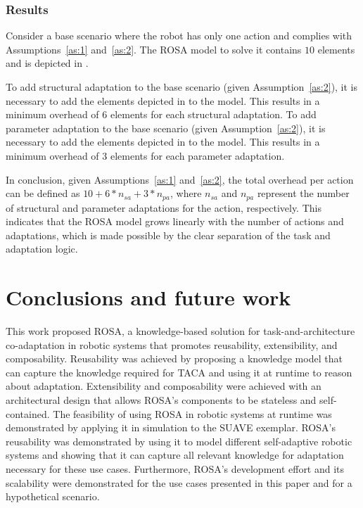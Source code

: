 \subsubsection{Results}
Consider a base scenario where the robot has only one action and complies with Assumptions~\ref{as:1} and~\ref{as:2}. The ROSA model to solve it contains $10$ elements and is depicted in .

To add structural adaptation to the base scenario (given Assumption~\mbox{\ref{as:2}}), it is necessary to add the elements depicted in  to the model.
This results in a minimum overhead of $6$ elements for each structural adaptation. To add parameter adaptation to the base scenario (given Assumption~\mbox{\ref{as:2}}), it is necessary to add the elements depicted in  to the model.
This results in a minimum overhead of $3$ elements for each parameter adaptation.

In conclusion, given Assumptions~\ref{as:1} and~\ref{as:2}, the total overhead per action can be defined as $10 + 6*n_{sa} + 3*n_{pa}$, where $n_{sa}$ and $n_{pa}$ represent the number of structural and parameter adaptations for the action, respectively.
This indicates that the ROSA model grows linearly with the number of actions and adaptations, which is made possible by the clear separation of the task and adaptation logic.


\section{Conclusions and future work}\label{sec:rosa:conclusion}
This work proposed ROSA, a knowledge-based solution for task-and-architecture co-adaptation in robotic systems that promotes reusability, extensibility, and composability. Reusability was achieved by proposing a knowledge model that can capture the knowledge required for TACA and using it at runtime to reason about adaptation. Extensibility and composability were achieved with an architectural design that allows ROSA's components to be stateless and self-contained. The feasibility of using ROSA in robotic systems at runtime was demonstrated by applying it in simulation to the SUAVE exemplar. ROSA's reusability was demonstrated by using it to model different self-adaptive robotic systems and showing that it can capture all relevant knowledge for adaptation necessary for these use cases.  Furthermore, ROSA's development effort and its scalability were demonstrated for the use cases presented in this paper and for a hypothetical scenario.
